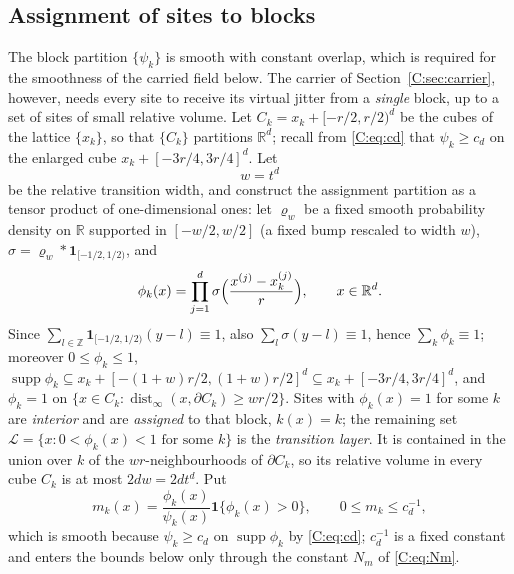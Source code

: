 \documentclass[11pt]{article}
\newcommand{\R}{\mathbb{R}}
\newcommand{\one}{\mathbf{1}}
\begin{document}
\subsection{Assignment of sites to blocks}\label{C:sec:assign}
The block partition \(\{\psi_k\}\) is smooth with constant overlap, which
is required for the smoothness of the carried field below.  The carrier
of Section~\ref{C:sec:carrier}, however, needs every site to receive its
virtual jitter from a \emph{single} block, up to a set of sites of small
relative volume.  Let \(C_k=x_k+[-r/2,r/2)^d\) be the cubes of the lattice
\(\{x_k\}\), so that \(\{C_k\}\) partitions \(\R^d\); recall from
\eqref{C:eq:cd} that \(\psi_k\ge c_d\) on the enlarged cube
\(x_k+[-3r/4,3r/4]^d\).  Let
\begin{equation}
 w=t^d
 \label{C:eq:layer-width}
\end{equation}
be the relative transition width, and construct the assignment partition
as a tensor product of one-dimensional ones: let \(\varrho_w\) be a fixed
smooth probability density on \(\R\) supported in \([-w/2,w/2]\) (a fixed
bump rescaled to width \(w\)), \(\sigma=\varrho_w*\one_{[-1/2,1/2)}\), and
\begin{equation}
 \phi_k(x)=\prod_{j=1}^d\sigma\Bigl(\frac{x^{(j)}-x_k^{(j)}}r\Bigr),\qquad x\in\R^d .
 \label{C:eq:phi-def}
\end{equation}
Since \(\sum_{l\in\mathbb Z}\one_{[-1/2,1/2)}(y-l)\equiv1\), also
\(\sum_l\sigma(y-l)\equiv1\), hence \(\sum_k\phi_k\equiv1\); moreover
\(0\le\phi_k\le1\), \(\operatorname{supp}\phi_k\subseteq x_k+[-(1+w)r/2,(1+w)r/2]^d\subseteq x_k+[-3r/4,3r/4]^d\),
and \(\phi_k=1\) on \(\{x\in C_k:\operatorname{dist}_\infty(x,\partial C_k)\ge wr/2\}\).
Sites with \(\phi_k(x)=1\) for some \(k\) are \emph{interior} and are
\emph{assigned} to that block, \(k(x)=k\); the remaining set
\(\mathcal L=\{x:0<\phi_k(x)<1\text{ for some }k\}\) is the
\emph{transition layer}.  It is contained in the union over \(k\) of the
\(wr\)-neighbourhoods of \(\partial C_k\), so its relative volume in every
cube \(C_k\) is at most \(2dw=2dt^d\).  Put
\begin{equation}
 m_k(x)=\frac{\phi_k(x)}{\psi_k(x)}\one\{\phi_k(x)>0\},\qquad 0\le m_k\le c_d^{-1} ,
 \label{C:eq:multiplier}
\end{equation}
which is smooth because \(\psi_k\ge c_d\) on \(\operatorname{supp}\phi_k\)
by \eqref{C:eq:cd}; \(c_d^{-1}\) is a fixed constant and enters the bounds
below only through the constant \(N_m\) of \eqref{C:eq:Nm}.
\end{document}
